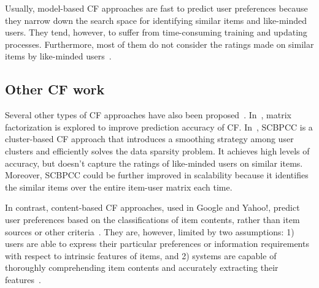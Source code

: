 Usually, model-based CF approaches are fast to predict user preferences
because they narrow down the search space for identifying similar items
and like-minded users. They tend, however, to suffer from
time-consuming training and updating processes. Furthermore, most of
them do not consider the ratings made on similar items by like-minded
users~\cite{Xuegr:CF@2005, HOFMANN@TOIS2004}.

\subsection{Other CF work}
Several other types of CF approaches have also been
proposed~\cite{Koren@2008KDD, Klein@JCSS, jin2006smm, Robert@2007ICDM,
Pennock:Personality@2000}. In~\cite{Rennie@ICML05, Robert@KDD07},
matrix factorization is explored to improve prediction accuracy of CF.
In~\cite{Xuegr:CF@2005}, SCBPCC is a cluster-based CF approach that
introduces a smoothing strategy among user clusters and efficiently
solves the data sparsity problem. It achieves high levels of accuracy,
but doesn't capture the ratings of like-minded users on similar items.
Moreover, SCBPCC could be further improved in scalability because it
identifies the similar items over the entire item-user matrix each
time.

In contrast, content-based CF approaches, used in Google and Yahoo!,
predict user preferences based on the classifications of item contents,
rather than item sources or other criteria~\cite{Gediminas:TKDE@2005,
Raymond:BookRecom@2000}. They are, however, limited by two assumptions:
1) users are able to express their particular preferences or
information requirements with respect to intrinsic features of items,
and 2) systems are capable of thoroughly comprehending item contents
and accurately extracting their features~\cite{HOFMANN@TOIS2004}.
